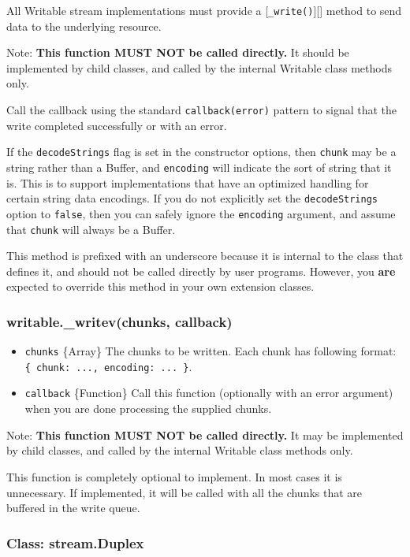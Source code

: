 All Writable stream implementations must provide a
{[}\texttt{\_write()}{]}{[}{]} method to send data to the underlying
resource.

Note: \textbf{This function MUST NOT be called directly.} It should be
implemented by child classes, and called by the internal Writable class
methods only.

Call the callback using the standard \texttt{callback(error)} pattern to
signal that the write completed successfully or with an error.

If the \texttt{decodeStrings} flag is set in the constructor options,
then \texttt{chunk} may be a string rather than a Buffer, and
\texttt{encoding} will indicate the sort of string that it is. This is
to support implementations that have an optimized handling for certain
string data encodings. If you do not explicitly set the
\texttt{decodeStrings} option to \texttt{false}, then you can safely
ignore the \texttt{encoding} argument, and assume that \texttt{chunk}
will always be a Buffer.

This method is prefixed with an underscore because it is internal to the
class that defines it, and should not be called directly by user
programs. However, you \textbf{are} expected to override this method in
your own extension classes.

\subsubsection{writable.\_writev(chunks, callback)}

\begin{itemize}
\item
  \texttt{chunks} \{Array\} The chunks to be written. Each chunk has
  following format: \texttt{\{ chunk: ..., encoding: ... \}}.
\item
  \texttt{callback} \{Function\} Call this function (optionally with an
  error argument) when you are done processing the supplied chunks.
\end{itemize}

Note: \textbf{This function MUST NOT be called directly.} It may be
implemented by child classes, and called by the internal Writable class
methods only.

This function is completely optional to implement. In most cases it is
unnecessary. If implemented, it will be called with all the chunks that
are buffered in the write queue.

\subsubsection{Class: stream.Duplex}

